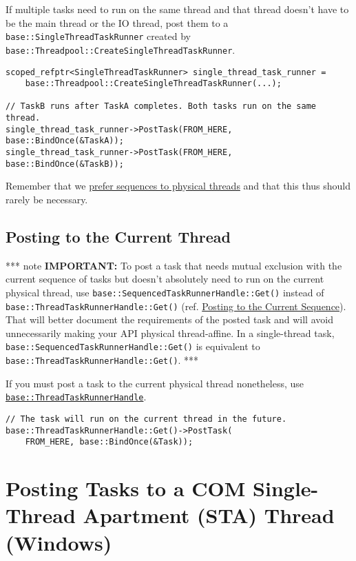 \documentclass[a4paper,12pt,notitlepage,twoside,openright]{article}
\begin{document}
If multiple tasks need to run on the same thread and that thread doesn't
have to be the main thread or the IO thread, post them to a
\texttt{base::SingleThreadTaskRunner} created by
\texttt{base::Threadpool::CreateSingleThreadTaskRunner}.

\begin{verbatim}
scoped_refptr<SingleThreadTaskRunner> single_thread_task_runner =
    base::Threadpool::CreateSingleThreadTaskRunner(...);

// TaskB runs after TaskA completes. Both tasks run on the same thread.
single_thread_task_runner->PostTask(FROM_HERE, base::BindOnce(&TaskA));
single_thread_task_runner->PostTask(FROM_HERE, base::BindOnce(&TaskB));
\end{verbatim}

Remember that we
\protect\hyperlink{prefer-sequences-to-physical-threads}{prefer
sequences to physical threads} and that this thus should rarely be
necessary.

\hypertarget{posting-to-the-current-thread}{%
\subsection{Posting to the Current
Thread}\label{posting-to-the-current-thread}}

*** note \textbf{IMPORTANT:} To post a task that needs mutual exclusion
with the current sequence of tasks but doesn't absolutely need to run on
the current physical thread, use
\texttt{base::SequencedTaskRunnerHandle::Get()} instead of
\texttt{base::ThreadTaskRunnerHandle::Get()} (ref.
\protect\hyperlink{Posting-to-the-Current-Virtual_Thread}{Posting to the
Current Sequence}). That will better document the requirements of the
posted task and will avoid unnecessarily making your API physical
thread-affine. In a single-thread task,
\texttt{base::SequencedTaskRunnerHandle::Get()} is equivalent to
\texttt{base::ThreadTaskRunnerHandle::Get()}. ***

If you must post a task to the current physical thread nonetheless, use
\href{https://cs.chromium.org/chromium/src/base/threading/thread_task_runner_handle.h}{\texttt{base::ThreadTaskRunnerHandle}}.

\begin{verbatim}
// The task will run on the current thread in the future.
base::ThreadTaskRunnerHandle::Get()->PostTask(
    FROM_HERE, base::BindOnce(&Task));
\end{verbatim}

\hypertarget{posting-tasks-to-a-com-single-thread-apartment-sta-thread-windows}{%
\section{Posting Tasks to a COM Single-Thread Apartment (STA) Thread
(Windows)}\label{posting-tasks-to-a-com-single-thread-apartment-sta-thread-windows}}
\end{document}
